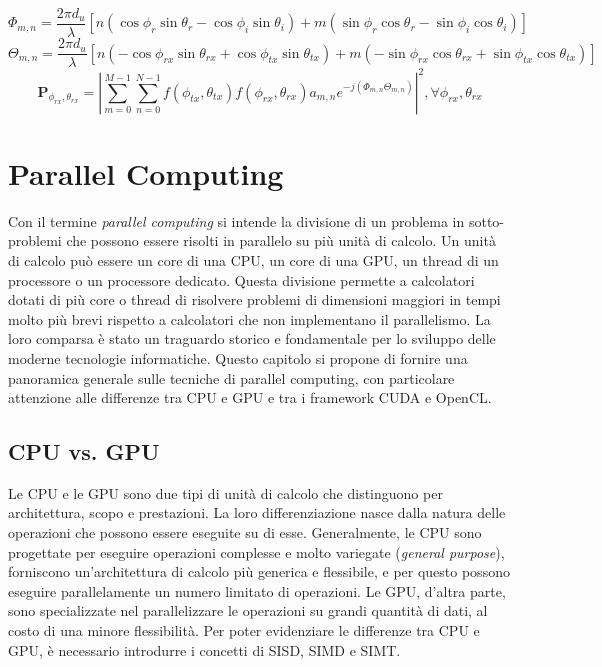 \begin{equation}
  \Phi_{m,n}= \frac{2\pi d_{u}}{\lambda}[n(\cos{\phi_{r}\sin{\theta_{r}}}-\cos{\phi_{i}}
  \sin{\theta_{i}})+m(\sin{\phi_{r}}\cos{\theta_{r}}-\sin{\phi_{i}}\cos{\theta_{i}}
  )]
\end{equation}
\label{eq:phase}
\begin{equation}
  \Theta_{m,n}= \frac{2\pi d_{u}}{\lambda}[n(-\cos{\phi_{rx}\sin{\theta_{rx}}}+\cos
  {\phi_{tx}}\sin{\theta_{tx}})+m(-\sin{\phi_{rx}}\cos{\theta_{rx}}+\sin{\phi_{tx}}
  \cos{\theta_{tx}})]
\end{equation}
\label{eq:phase}
\begin{equation}
  \textbf{P}_{\phi_{rx},\theta_{rx}}= \left|\sum_{m=0}^{M-1}{\sum_{n=0}^{N-1}{f(\phi_{tx}, \theta_{tx})f(\phi_{rx},\theta_{rx})a_{m,n}e^{-j(\Phi_{m,n}\Theta_{m,n})}}}
  \right|^{2}, \forall \phi_{rx}, \theta_{rx}
\end{equation}
\label{eq:power}

\section{Parallel Computing}
\label{sec:parallelcomputing}

Con il termine \textit{parallel computing} si intende la divisione di un problema
in sotto-problemi che possono essere risolti in parallelo su più unità di calcolo.
Un unità di calcolo può essere un core di una CPU, un core di una GPU, un thread
di un processore o un processore dedicato. Questa divisione permette a calcolatori
dotati di più core o thread di risolvere problemi di dimensioni maggiori in tempi
molto più brevi rispetto a calcolatori che non implementano il parallelismo. La
loro comparsa è stato un traguardo storico e fondamentale per lo sviluppo delle
moderne tecnologie informatiche. Questo capitolo si propone di fornire una panoramica
generale sulle tecniche di parallel computing, con particolare attenzione alle
differenze tra CPU e GPU e tra i framework CUDA e OpenCL.

\subsection{CPU vs. GPU}
\label{subsec:cpuvsgpu}

Le CPU e le GPU sono due tipi di unità di calcolo che distinguono per architettura,
scopo e prestazioni. La loro differenziazione nasce dalla natura delle operazioni
che possono essere eseguite su di esse. Generalmente, le CPU sono progettate per
eseguire operazioni complesse e molto variegate (\textit{general purpose}), forniscono
un'architettura di calcolo più generica e flessibile, e per questo possono
eseguire parallelamente un numero limitato di operazioni. Le GPU, d'altra parte,
sono specializzate nel parallelizzare le operazioni su grandi quantità di dati,
al costo di una minore flessibilità. Per poter evidenziare le differenze tra CPU
e GPU, è necessario introdurre i concetti di SISD, SIMD e SIMT.

